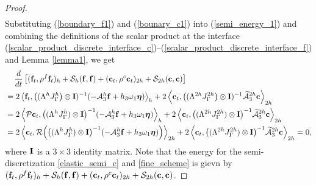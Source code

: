 \begin{proof}
\begin{multline}
	\end{multline}
	Substituting (\ref{boundary_f1}) and (\ref{bounary_c1}) into (\ref{semi_energy_1}) and combining the definitions of the scalar product at the interface (\ref{scalar_product_discrete_interface_c})--(\ref{scalar_product_discrete_interface_f}) and Lemma \ref{lemma1}, we get
	\begin{align*}\label{semi_energy_2}
	&\hspace{0.4cm}\frac{d}{dt}\left[({\bf f}_t,\rho^f {\bf f}_t)_{h} + \mathcal{S}_{h}({\bf f},{\bf f}) + ({\bf c}_t,\rho^{c} {\bf c}_t)_{2h} + \mathcal{S}_{2h}({\bf c},{\bf c}) \right]   \nonumber\\
	& = 2\left<{\bf f}_t,\big(({\Lambda}^{h}{J}^h_\Gamma\big)\otimes {\bf I})^{-1}(-\mathcal{A}_3^h{\bf f}+h_3\omega_1{\bm \eta})\right>_{h}+ 2\left<{\bf c}_t,\big(({\Lambda}^{2h}{J}^{2h}_\Gamma\big)\otimes{\bf I})^{-1}\wt{\mathcal{A}}_3^{2h}{\bf c}\right>_{2h} \nonumber\\
	& = 2\left<{\mathcal{P}}{\bf c}_t,\big(({\Lambda}^{h}{J}^h_\Gamma)\otimes{\bf I}\big)^{-1}(-\mathcal{A}_3^h{\bf f}+h_3\omega_1{\bm \eta})\right>_{h}+ 2\left<{\bf c}_t, \big(({\Lambda}^{2h}{J}^{2h}_\Gamma)\otimes{\bf I}\big)^{-1}\wt{\mathcal{A}}_3^{2h}{\bf c}\right>_{2h} \nonumber\\
	& = 2\left<{\bf c}_t,{\mathcal{R}}\Big(\big(({\Lambda}^{h}{J}^h_\Gamma)\otimes{\bf I}\big)^{-1}(-\mathcal{A}_3^h{\bf f}+h_3\omega_1{\bm \eta})\Big)\right>_{2h}+ 2\left<{\bf c}_t,\big(({\Lambda}^{2h}{J}^{2h}_\Gamma)\otimes{\bf I}\big)^{-1}\wt{\mathcal{A}}_3^{2h}{\bf c}\right>_{2h} = 0,
	\end{align*}
	where ${\bf I}$ is a $3\times3$ identity matrix. Note that the energy for the semi-discretization \eqref{elastic_semi_c} and \eqref{fine_scheme} is gievn by $({\bf f}_t,\rho^f {\bf f}_t)_{h} + \mathcal{S}_{h}({\bf f},{\bf f}) + ({\bf c}_t,\rho^{c} {\bf c}_t)_{2h} + \mathcal{S}_{2h}({\bf c},{\bf c})$.
\end{proof}








 